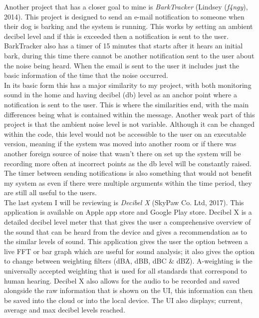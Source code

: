 \documentclass[a4paper,11pt]{report}
\begin{document}
Another project that has a closer goal to mine is \textit{BarkTracker} (Lindsey (\textit{f4ngy}), 2014). This project is designed to send an e-mail notification to someone when their dog is barking and the system is running. This works by setting an ambient decibel level and if this is exceeded then a notification is sent to the user. BarkTracker also has a timer of 15 minutes that starts after it hears an initial bark, during this time there cannot be another notification sent to the user about the noise being heard. When the email is sent to the user it includes just the basic information of the time that the noise occurred.\\

In its basic form this has a major similarity to my project, with both monitoring sound in the home and having decibel (db) level as an anchor point where a notification is sent to the user. This is where the similarities end, with the main differences being what is contained within the message. Another weak part of this project is that the ambient noise level is not variable. Although it can be changed within the code, this level would not be accessible to the user on an executable version, meaning if the system was moved into another room or if there was another foreign source of noise that wasn’t there on set up the system will be recording more often at incorrect points as the db level will be constantly raised. The timer between sending notifications is also something that would not benefit my system as even if there were multiple arguments within the time period, they are still all useful to the users.\\

The last system I will be reviewing is \textit{Decibel X} (SkyPaw Co. Ltd, 2017). This application is available on Apple app store and Google Play store. Decibel X is a detailed decibel level meter that that gives the user a comprehensive overview of the sound that can be heard from the device and gives a recommendation as to the similar levels of sound. This application gives the user the option between a live FFT or bar graph which are useful for sound analysis; it also gives the option to change between weighting filters (dBA, dBB, dBC \& dBZ). A-weighting is the universally accepted weighting that is used for all standards that correspond to human hearing. Decibel X also allows for the audio to be recorded and saved alongside the raw information that is shown on the UI, this information can then be saved into the cloud or into the local device. The UI also displays; current, average and max decibel levels reached.\\
\end{document}
